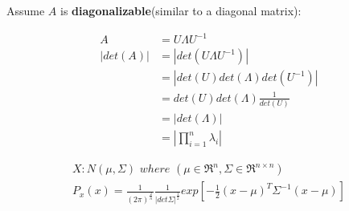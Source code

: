 Assume $A$ is \textbf{diagonalizable}(similar to a diagonal matrix):

\begin{align*}
A &= U\Lambda U^{-1}\\
|det(A)| &= |det(U\Lambda U^{-1})| \\
&= |det(U)det(\Lambda)det(U^{-1})|\\
&= det(U)det(\Lambda)\frac{1}{det(U)}\\
&= |det(\Lambda)|\\
&= |\prod^n_{i=1}\lambda_i|
\end{align*}

\begin{align*}
X: N(\mu, \Sigma)\,\,where\,\,(\mu \in \Re^n, \Sigma \in \Re^{n\times n})\\
P_x(x) = \frac{1}{(2\pi)^{\frac{2}{n}}}\frac{1}{|det\Sigma|^{\frac{1}{2}}}exp[-\frac{1}{2}(x - \mu)^T\Sigma^{-1}(x - \mu)]
\end{align*}
